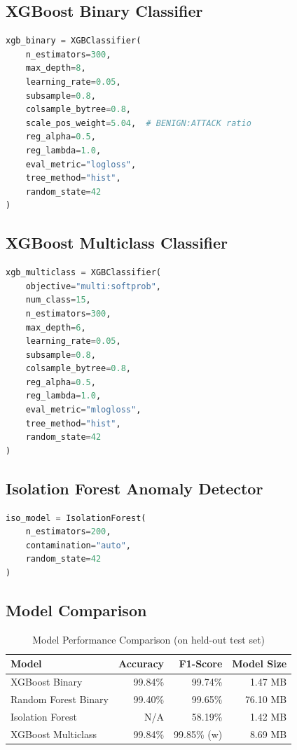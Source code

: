 \documentclass[12pt,a4paper]{article}
\begin{document}
\subsection{XGBoost Binary Classifier}

\begin{lstlisting}[language=Python, caption=XGBoost Binary Classifier Configuration]
xgb_binary = XGBClassifier(
    n_estimators=300,
    max_depth=8,
    learning_rate=0.05,
    subsample=0.8,
    colsample_bytree=0.8,
    scale_pos_weight=5.04,  # BENIGN:ATTACK ratio
    reg_alpha=0.5,
    reg_lambda=1.0,
    eval_metric="logloss",
    tree_method="hist",
    random_state=42
)
\end{lstlisting}

\subsection{XGBoost Multiclass Classifier}

\begin{lstlisting}[language=Python, caption=XGBoost Multiclass Classifier Configuration]
xgb_multiclass = XGBClassifier(
    objective="multi:softprob",
    num_class=15,
    n_estimators=300,
    max_depth=6,
    learning_rate=0.05,
    subsample=0.8,
    colsample_bytree=0.8,
    reg_alpha=0.5,
    reg_lambda=1.0,
    eval_metric="mlogloss",
    tree_method="hist",
    random_state=42
)
\end{lstlisting}

\subsection{Isolation Forest Anomaly Detector}

\begin{lstlisting}[language=Python, caption=Isolation Forest Configuration]
iso_model = IsolationForest(
    n_estimators=200,
    contamination="auto",
    random_state=42
)
\end{lstlisting}

\subsection{Model Comparison}

\begin{table}[H]
\centering
\caption{Model Performance Comparison (on held-out test set)}
\label{tab:model_comparison}
\begin{tabular}{|l|r|r|r|}
\hline
\textbf{Model} & \textbf{Accuracy} & \textbf{F1-Score} & \textbf{Model Size} \\
\hline
XGBoost Binary & 99.84\% & 99.74\% & 1.47 MB \\
Random Forest Binary & 99.40\% & 99.65\% & 76.10 MB \\
Isolation Forest & N/A & 58.19\% & 1.42 MB \\
XGBoost Multiclass & 99.84\% & 99.85\% (w) & 8.69 MB \\
\hline
\end{tabular}
\end{table}
\end{document}
